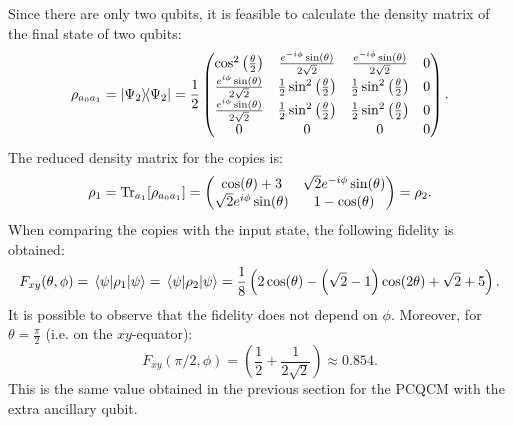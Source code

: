 Since there are only two qubits, it is feasible to calculate the density matrix of the final state of two qubits:
\[
    \rho_{a_0 a_1}=\ketbra{\Psi_2}{\Psi_2}=\frac{1}{2}\begin{pmatrix}
        \cos ^2\left(\frac{\theta }{2}\right) & \frac{e^{-i \phi } \sin (\theta )}{2 \sqrt{2}} & \frac{e^{-i \phi } \sin (\theta )}{2 \sqrt{2}} & 0 \\
        \frac{e^{i \phi } \sin (\theta )}{2 \sqrt{2}} & \frac{1}{2} \sin ^2\left(\frac{\theta }{2}\right) & \frac{1}{2} \sin ^2\left(\frac{\theta }{2}\right) & 0 \\
        \frac{e^{i \phi } \sin (\theta )}{2 \sqrt{2}} & \frac{1}{2} \sin ^2\left(\frac{\theta }{2}\right) & \frac{1}{2} \sin ^2\left(\frac{\theta }{2}\right) & 0 \\
        0 & 0 & 0 & 0 \\
    \end{pmatrix}.
\]
The reduced density matrix for the copies is:
\[
    \rho_1=\Tr_{a_1}[\rho_{a_0 a_1}]=
        \begin{pmatrix}
            \cos (\theta )+3 & \sqrt{2} e^{-i \phi } \sin (\theta ) \\
            \sqrt{2} e^{i \phi } \sin (\theta ) & 1-\cos (\theta ) \\
        \end{pmatrix}=\rho_2.
\]
When comparing the copies with the input state, the following fidelity is obtained:
\begin{equation}
    F_{xy}(\theta,\phi)=\expval{\rho_1}{\psi}=\expval{\rho_2}{\psi}=\frac{1}{8} \left(2 \cos (\theta )-\left(\sqrt{2}-1\right) \cos (2 \theta )+\sqrt{2}+5\right).
\end{equation}
It is possible to observe that the fidelity does not depend on $\phi$. Moreover, for $\theta=\frac{\pi}{2}$ (i.e. on the $xy$-equator):
\[
    F_{xy}(\pi/2,\phi)=\left(\frac{1}{2}+\frac{1}{2\sqrt{2}}\right)\approx 0.854.
\]
This is the same value obtained in the previous section for the PCQCM with the extra ancillary qubit.
